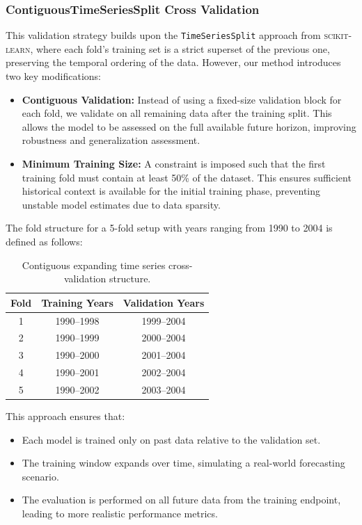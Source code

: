 \documentclass[ruler]{CUP-JNL-EDS}%
\begin{document}
\subsubsection*{ContiguousTimeSeriesSplit Cross Validation}
This validation strategy builds upon the \texttt{TimeSeriesSplit} approach from \textsc{scikit-learn}, where each fold's training set is a strict superset of the previous one, preserving the temporal ordering of the data. However, our method introduces two key modifications:

\begin{itemize}
    \item \textbf{Contiguous Validation:} Instead of using a fixed-size validation block for each fold, we validate on all remaining data after the training split. This allows the model to be assessed on the full available future horizon, improving robustness and generalization assessment.
    \vspace{5mm}
    \item \textbf{Minimum Training Size:} A constraint is imposed such that the first training fold must contain at least 50\% of the dataset. This ensures sufficient historical context is available for the initial training phase, preventing unstable model estimates due to data sparsity.
\end{itemize}

The fold structure for a 5-fold setup with years ranging from 1990 to 2004 is defined as follows:

\begin{table}[h!]

\centering
\begin{tabular}{ccc}
\hline
\textbf{Fold} & \textbf{Training Years} & \textbf{Validation Years} \\
\hline
1 & 1990--1998 & 1999--2004 \\
2 & 1990--1999 & 2000--2004 \\
3 & 1990--2000 & 2001--2004 \\
4 & 1990--2001 & 2002--2004 \\
5 & 1990--2002 & 2003--2004 \\
\hline
\end{tabular}
\caption{Contiguous expanding time series cross-validation structure.}
\end{table}

This approach ensures that:
\begin{itemize}
    \item Each model is trained only on past data relative to the validation set.
    \item The training window expands over time, simulating a real-world forecasting scenario.
    \item The evaluation is performed on all future data from the training endpoint, leading to more realistic performance metrics.
\end{itemize}
\end{document}

